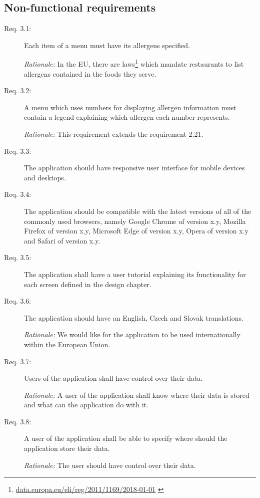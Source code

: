\newpage

\subsection{Non-functional requirements}
\begin{description}
    \item [Req. 3.1:] Each item of a menu must have its allergens specified.
    
    \emph{Rationale:} In the EU, there are laws\footnote{\url{data.europa.eu/eli/reg/2011/1169/2018-01-01}  \label{fnlabel}} which mandate restaurants to list allergens contained in the foods they serve.
    \item [Req. 3.2:] A menu which uses numbers for displaying allergen information must contain a legend explaining which allergen each number represents.

    \emph{Rationale:} This requirement extends the requirement 2.21.
    \item [Req. 3.3:] The application should have responsive user interface for mobile devices and desktops.
    \item [Req. 3.4:] The application should be compatible with the latest versions of all of the commonly used browsers, namely Google Chrome of version x.y, Mozilla Firefox of version x.y, Microsoft Edge of version x.y, Opera of version x.y and Safari of version x.y.
    \item [Req. 3.5:] The application shall have a user tutorial explaining its functionality for each screen defined in the design chapter.
    \item [Req. 3.6:] The application should have an English, Czech and Slovak translations.

    \emph{Rationale:} We would like for the application to be used internationally within the European Union.
    \item [Req. 3.7:] Users of the application shall have control over their data.

    \emph{Rationale:} A user of the application shall know where their data is stored and what can the application do with it.
    \item [Req. 3.8:] A user of the application shall be able to specify where should the application store their data.

    \emph{Rationale:} The user should have control over their data.
\end{description}

\vspace*{\fill}